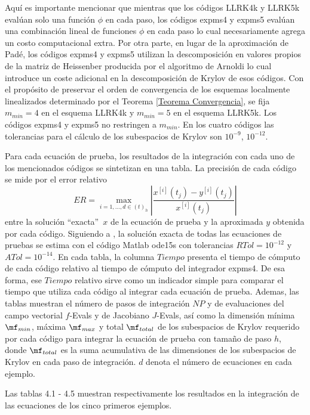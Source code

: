 Aquí es importante mencionar que mientras que los códigos LLRK4k y LLRK5k eval\'uan solo una funci\'on $\phi$ en cada paso, los códigos expms4 y expms5 eval\'uan una combinaci\'on lineal de funciones $\phi$ en cada paso lo cual necesariamente agrega un costo computacional extra. Por otra parte, en lugar de la aproximación de Padé, los códigos expms4 y expms5 utilizan la descomposición en valores propios de la matriz de Heissenber producida por el algoritmo de Arnoldi lo cual introduce un coste adicional en la descomposición de Krylov de esos códigos. Con el propósito de preservar el orden de convergencia de los esquemas localmente linealizados determinado por el Teorema \ref{Teorema Convergencia}, se fija $m_{min}=4$ en el esquema LLRK4k y $m_{min}=5$ en el esquema LLRK5k. Los códigos expms4 y expms5 no restringen a $m_{min}$. En los cuatro códigos las tolerancias para el cálculo de los subespacios de Krylov son $10^{-9}$, $10^{-12}$.


Para cada ecuación de prueba, los resultados de la integración con cada uno de los mencionados códigos se sintetizan en una tabla. La precisión de cada código se mide por el error relativo
\[ ER = \max_{i=1,\ldots,d\in(t)_h}\left\lvert\frac{x^{[i]}(t_j)-y^{[i]}(t_j)}{x^{[i]}(t_j)}\right\rvert \]
entre la soluci\'on \textquotedblleft exacta\textquotedblright ~$x$ de la ecuación de prueba y la aproximada $y$ obtenida por cada código. Siguiendo a \cite{tokman}, la solución exacta de todas las ecuaciones de pruebas se estima con el código Matlab ode15s con tolerancias $RTol=10^{-12}$ y $ATol=10^{-14}$. En cada tabla, la columna $Tiempo$ presenta el tiempo de cómputo de cada código relativo al tiempo de cómputo del integrador expms4.  
De esa forma, ese $Tiempo$ relativo sirve como un indicador simple para comparar el tiempo que utiliza cada código al integrar cada ecuación de prueba. 
Ademas, las tablas muestran el número de pasos de integración $NP$ y de evaluaciones del campo vectorial $f$-Evals y de Jacobiano $J$-Evals, así como la dimensión mínima  $\mf_{min}$, máxima $\mf_{max}$ y total $\mf_{total}$ de los subespacios de Krylov requerido por cada código para integrar la ecuación de prueba con tamaño de paso $h$, donde $\mf_{total}$ es la suma acumulativa de las dimensiones de los subespacios de Krylov en cada paso de integración. $d$ denota el número de ecuaciones en cada ejemplo.

Las tablas 4.1 - 4.5 muestran respectivamente los resultados en la integración de las ecuaciones de los cinco primeros ejemplos. 

